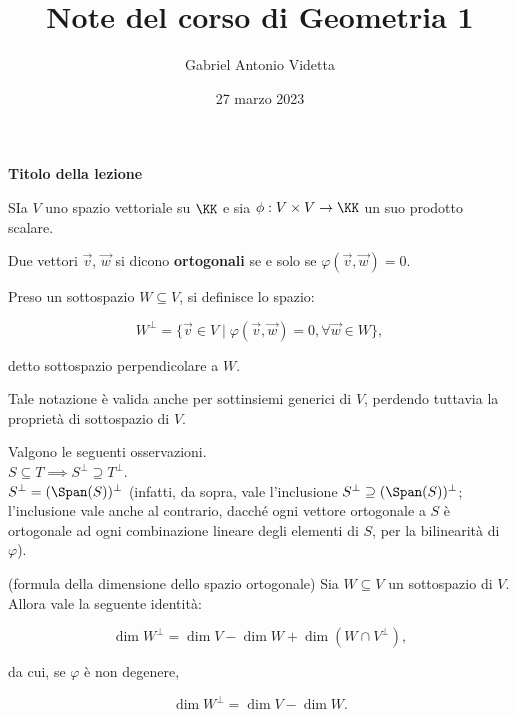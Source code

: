 \documentclass[11pt]{article}
\title{\textbf{Note del corso di Geometria 1}}
\author{Gabriel Antonio Videtta}
\date{27 marzo 2023}
\begin{document}
	
	\maketitle
	
	\begin{center}
		\Large \textbf{Titolo della lezione}
	\end{center}

	SIa $V$ uno spazio vettoriale su $\KK$ e sia $\phi : V \times V \to \KK$
	un suo prodotto scalare.
	
	\begin{definition}
		Due vettori $\vec v$, $\vec w$ si dicono \textbf{ortogonali} se e
		solo se $\varphi(\vec v, \vec w) = 0$.
	\end{definition}

	\begin{definition}
		Preso un sottospazio $W \subseteq V$, si definisce lo spazio:
		
		\[ W^\perp = \{ \vec v \in V \mid \varphi(\vec v, \vec w) = 0, \forall \vec w \in W \}, \]
		
		detto sottospazio perpendicolare a $W$.
	\end{definition}

	\begin{note}
		Tale notazione è valida anche per sottinsiemi generici di $V$,
		perdendo tuttavia la proprietà di sottospazio di $V$.
	\end{note}

	\begin{remark}
		Valgono le seguenti osservazioni. \\
		
		\li $S \subseteq T \implies S^\perp \supseteq T^\perp$. \\
		\li $S^\perp = (\Span(S))^\perp$ (infatti, da sopra,
		vale l'inclusione $S^\perp \supseteq (\Span(S))^\perp$;
		l'inclusione vale anche al contrario, dacché ogni vettore
		ortogonale a $S$ è ortogonale ad ogni combinazione lineare
		degli elementi di $S$, per la bilinearità di $\varphi$).
	\end{remark}

	\begin{theorem} (formula della dimensione dello spazio ortogonale)
		Sia $W \subseteq V$ un sottospazio di $V$. Allora vale la seguente
		identità:
		
		\[ \dim W^\perp = \dim V - \dim W + \dim (W \cap V^\perp), \]
		
		da cui, se $\varphi$ è non degenere,
		
		\[ \dim W^\perp = \dim V - \dim W. \]
	\end{theorem}
\end{document}
